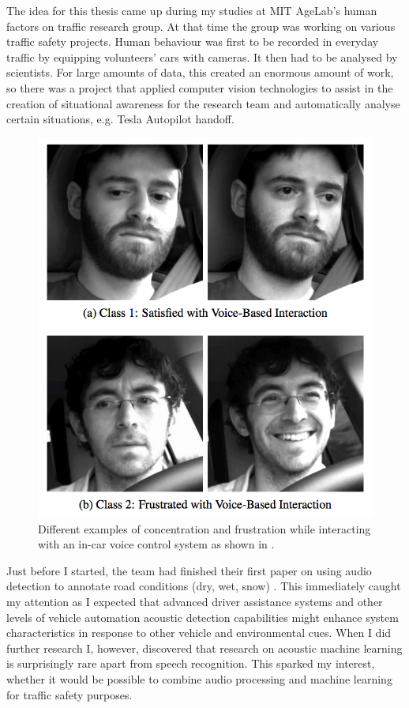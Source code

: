 
The idea for this thesis came up during my studies at MIT AgeLab's human factors on traffic research group. At that time the group was working on various traffic safety projects. Human behaviour was first to be recorded in everyday traffic by equipping volunteers' cars with cameras. It then had to be analysed by scientists. For large amounts of data, this created an enormous amount of work, so there was a project that applied computer vision technologies to assist in the creation of situational awareness for the research team and automatically analyse certain situations, e.g. Tesla Autopilot handoff. 


\begin{figure}[h]
    \centering
	\includegraphics[width=.85\textwidth]{./images/illustrations/driver-frustration}
    \caption{Different examples of concentration and frustration while interacting with an in-car voice control system as shown in \cite{Abdic:2016:DFD:3060621.3060809}.}
    \label{fig:am}
\end{figure}


Just before I started, the team had finished their first paper on using audio detection to annotate road conditions (dry, wet, snow) \cite{Abdic:2016:DFD:3060621.3060809}. This immediately caught my attention as I expected that advanced driver assistance systems and other levels of vehicle automation acoustic detection capabilities might enhance system characteristics in response to other vehicle and environmental cues. When I did further research I, however, discovered that research on acoustic machine learning is surprisingly rare apart from speech recognition. This sparked my interest, whether it would be possible to combine audio processing and machine learning for traffic safety purposes. 


